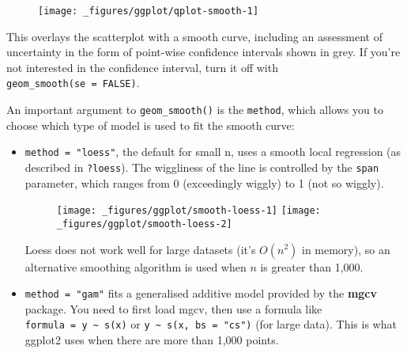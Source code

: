 \begin{figure}[H]
  \centering
  \texttt{[image: \_figures/ggplot/qplot-smooth-1]}
\end{figure}

This overlays the scatterplot with a smooth curve, including an
assessment of uncertainty in the form of point-wise confidence intervals
shown in grey. If you're not interested in the confidence interval, turn
it off with \texttt{geom\_smooth(se\ =\ FALSE)}.

An important argument to \texttt{geom\_smooth()} is the \texttt{method},
which allows you to choose which type of model is used to fit the smooth
curve:

\begin{itemize}
\item
  \texttt{method\ =\ "loess"}, the default for small n, uses a smooth
  local regression (as described in \texttt{?loess}). The wiggliness of
  the line is controlled by the \texttt{span} parameter, which ranges
  from 0 (exceedingly wiggly) to 1 (not so wiggly).

\begin{Shaded}
\begin{Highlighting}[]
\OperatorTok{+}\StringTok{ }
\StringTok{  }\NormalTok{() }\OperatorTok{+}\StringTok{ }
\StringTok{  }\NormalTok{(} \NormalTok{)}

\OperatorTok{+}\StringTok{ }
\StringTok{  }\NormalTok{() }\OperatorTok{+}\StringTok{ }
\StringTok{  }\NormalTok{(} \NormalTok{)}
\end{Highlighting}
\end{Shaded}

  \begin{figure}[H]
    \texttt{[image: \_figures/ggplot/smooth-loess-1]}%
    \texttt{[image: \_figures/ggplot/smooth-loess-2]}
  \end{figure}

  Loess does not work well for large datasets (it's \(O(n^2)\) in
  memory), so an alternative smoothing algorithm is used when \(n\) is
  greater than 1,000.
\item
  \texttt{method\ =\ "gam"} fits a generalised additive model provided
  by the \textbf{mgcv} package. You need to first load mgcv, then use a
  formula like \texttt{formula\ =\ y\ \textasciitilde{}\ s(x)} or
  \texttt{y\ \textasciitilde{}\ s(x,\ bs\ =\ "cs")} (for large data).
  This is what ggplot2 uses when there are more than 1,000 points.


\end{itemize}
